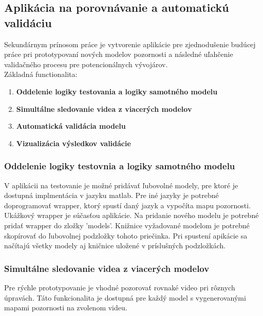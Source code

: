 \subsection{Aplikácia na porovnávanie a automatickú validáciu}
Sekundárnym prínosom práce je vytvorenie aplikácie pre zjednodušenie budúcej práce pri prototypovaní nových modelov pozornosti a následné uľahčenie validačného procesu pre potencionálnych vývojárov.\\
Základná functionalita:
\begin{enumerate}
  \item\textbf{Oddelenie logiky testovania a logiky samotného modelu}
  \item\textbf{Simultálne sledovanie videa z viacerých modelov}
  \item\textbf{Automatická validácia modelu}
  \item\textbf{Vizualizácia výsledkov validácie}
\end{enumerate}

\subsubsection{Oddelenie logiky testovnia a logiky samotného modelu}
V aplikácii na testovanie je možné pridávať ľubovolné modely, pre ktoré je dostupná implmentácia v jazyku matlab.
Pre iné jazyky je potrebné doprogramovať wrapper, ktorý spustí daný jazyk a vypočíta mapu pozornosti.
Ukážkový wrapper je súčasťou aplikácie.
Na pridanie nového modelu je potrebné pridať wrapper do zložky 'models'.
Knižnice vyžadované modelom je potrebné skopírovať do ľubovolnej podzložky tohoto priečinka.
Pri spustení apikácie sa načítajú všetky modely aj kničnice uložené v príslušných podzložkách.

\subsubsection{Simultálne sledovanie videa z viacerých modelov}
Pre rýchle prototypovanie je vhodné pozorovať rovnaké video pri rôznych úpravách.
Táto funkcionalita je dostupná pre každý model s vygenerovanými mapami pozornosti na zvolenom videu.

